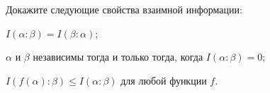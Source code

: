 Докажите следующие свойства взаимной информации:
\begin{enumcyr}
    \item $I(\alpha : \beta) = I(\beta : \alpha)$;
    \item $\alpha$ и $\beta$ независимы тогда и только тогда, когда $I(\alpha : \beta) = 0$;
    \item $I(f(\alpha) : \beta) \le I(\alpha : \beta)$ для любой функции $f$.
\end{enumcyr}